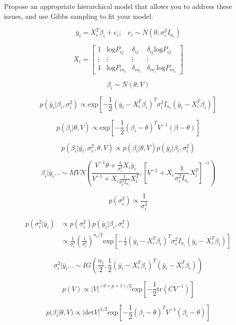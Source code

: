 \documentclass[10pt]{article}
\begin{document}
    Propose an appropriate hierarchical model that allows you to address these issues, and use Gibbs sampling to fit your model.

    $$\bar{y}_i = X_i^T \beta_i  + e_i; \hspace{10pt} e_i \sim N(0, \sigma_i^2 I_{n_i})$$

    $$X_i = \begin{bmatrix}1 & \text{log}P_{ij} & \delta_{ij} & \delta_{ij} \text{log}P_{ij} \\
    \vdots & \vdots & \vdots & \vdots \\
    1 & \text{log}P_{in_i} & \delta_{in_i} & \delta_{in_i} \text{log}P_{in_i}
     \end{bmatrix}$$

    $$\beta_i \sim N(\theta, V)$$

    $$p(\bar{y}_i | \beta_i, \sigma_i^2) \propto \text{exp}\left[-\frac{1}{2} (\bar{y}_i - X_i^T \beta_i)^T \sigma_i^2 I_{n_i} (\bar{y}_i - X_i^T \beta_i) \right]$$

    $$p(\beta_i | \theta, V) \propto \text{exp} \left[-\frac{1}{2} (\beta_i - \theta)^T V^{-1} (\beta - \theta) \right]$$

    $$p(\beta_i | \bar{y_i}, \sigma_i^2, \theta, V) \propto  p(\beta_i | \theta, V) p(\bar{y}_i | \beta_i, \sigma_i^2) $$

    $$\beta_i | \bar{y}_i \dots \sim MVN\left(\frac{V^{-1} \theta + \frac{1}{\sigma_i^2 }X_i \bar{y}_i }{V^{-1} + X_i \frac{1}{\sigma_i^2 I_{n_i}} X_i^T}, \left[V^{-1} + X_i \frac{1}{\sigma_i^2 I_{n_i}} X_i^T \right]^{-1} \right)$$

    $$p(\sigma_i^2) \propto \frac{1}{\sigma_i^2}$$

    \begin{align*}
    p(\sigma_i^2| \bar{y}_i) &\propto p(\sigma_i^2) p(\bar{y}_i | \beta_i, \sigma_i^2) \\
    & \propto \frac{1}{\sigma_i^2} \left(\frac{1}{\sigma_i^2}\right)^{n_i/2} \text{exp}\left[ -\frac{1}{2} (\bar{y}_i - X_i^T \beta_i)^T \sigma_i^2 I_{n_i} (\bar{y}_i - X_i^T \beta_i)\right]
    \end{align*}

    $$\sigma_i^2 | \bar{y}_i \dots \sim IG\left(\frac{n_i}{2},  \frac{1}{2} (\bar{y}_i - X_i^T \beta_i)^T (\bar{y}_i - X_i^T \beta_i)\right)$$

    $$p(V) \propto |V|^{(d+p+1)/2} \text{exp}\left[-\frac{1}{2} \text{tr}(C V^{-1}) \right]$$ 

    $$p(\beta_i | \theta, V) \propto | \text{det} V |^{1/2} \text{exp}\left[-\frac{1}{2} (\beta_i - \theta)^T V^{-1} (\beta_i - \theta) \right]$$
\end{document}
